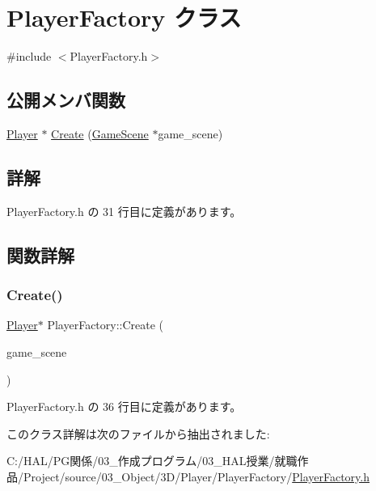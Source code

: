 \hypertarget{class_player_factory}{}\section{Player\+Factory クラス}
\label{class_player_factory}


{\ttfamily \#include $<$Player\+Factory.\+h$>$}

\subsection*{公開メンバ関数}
\begin{DoxyCompactItemize}
\item 
\mbox{\hyperlink{class_player}{Player}} $\ast$ \mbox{\hyperlink{class_player_factory_a7429328c81ec97fdaafb9eef756c0dba}{Create}} (\mbox{\hyperlink{class_game_scene}{Game\+Scene}} $\ast$game\+\_\+scene)
\end{DoxyCompactItemize}


\subsection{詳解}


 Player\+Factory.\+h の 31 行目に定義があります。



\subsection{関数詳解}
\mbox{\label{class_player_factory_a7429328c81ec97fdaafb9eef756c0dba}} 
\subsubsection{\texorpdfstring{Create()}{Create()}}
{\footnotesize\ttfamily \mbox{\hyperlink{class_player}{Player}}$\ast$ Player\+Factory\+::\+Create (\begin{DoxyParamCaption}\item[{\mbox{\hyperlink{class_game_scene}{Game\+Scene}} $\ast$}]{game\+\_\+scene }\end{DoxyParamCaption})\hspace{0.3cm}{\ttfamily [inline]}}



 Player\+Factory.\+h の 36 行目に定義があります。



このクラス詳解は次のファイルから抽出されました\+:\begin{DoxyCompactItemize}
\item 
C\+:/\+H\+A\+L/\+P\+G関係/03\+\_\+作成プログラム/03\+\_\+\+H\+A\+L授業/就職作品/\+Project/source/03\+\_\+\+Object/3\+D/\+Player/\+Player\+Factory/\mbox{\hyperlink{_player_factory_8h}{Player\+Factory.\+h}}\end{DoxyCompactItemize}
